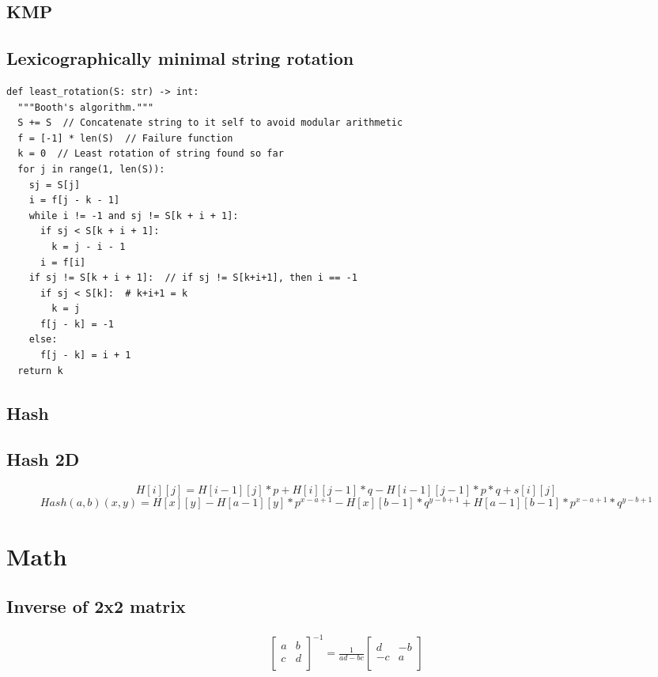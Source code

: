 \documentclass[a4paper, 12pt, oneside, landscape]{article}
\begin{document}
\begin{multicols}{2}
	\subsection{KMP}
	
	
	\subsection{Lexicographically minimal string rotation}
	\begin{lstlisting}
def least_rotation(S: str) -> int:
  """Booth's algorithm."""
  S += S  // Concatenate string to it self to avoid modular arithmetic
  f = [-1] * len(S)  // Failure function
  k = 0  // Least rotation of string found so far
  for j in range(1, len(S)):
    sj = S[j]
    i = f[j - k - 1]
    while i != -1 and sj != S[k + i + 1]:
      if sj < S[k + i + 1]:
        k = j - i - 1
      i = f[i]
    if sj != S[k + i + 1]:  // if sj != S[k+i+1], then i == -1
      if sj < S[k]:  # k+i+1 = k
        k = j
      f[j - k] = -1
    else:
      f[j - k] = i + 1
  return k
	\end{lstlisting}
	
	\subsection{Hash}
	
	
	\subsection{Hash 2D}
	\begin{dmath}
	H[i][j] = H[i - 1][j] * p + H[i][j - 1] * q - H[i - 1][j - 1] * p * q + s[i][j]
	\end{dmath}
	\begin{dmath}
	Hash(a,b)(x,y) = H[x][y] - H[a - 1][y]*p^{x - a + 1} - H[x][b - 1]*q^{y - b + 1} + H[a - 1][b - 1] * p^{x - a + 1} * q^{y - b + 1}
	\end{dmath}

\section{Math}	
    \subsection{Inverse of 2x2 matrix}
    \begin{align*}
        \begin{bmatrix}
        a & b \\
        c & d \\
        \end{bmatrix} ^ {-1} = \frac{1}{ad - bc}
        \begin{bmatrix}
            d & -b \\
            -c & a \\
        \end{bmatrix}
    \end{align*}
    

\end{multicols}
\end{document}
